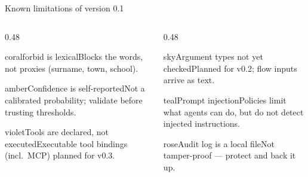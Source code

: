 \documentclass[aspectratio=169,11pt]{beamer}
\begin{document}
\begin{frame}{Known limitations of version 0.1}
\vspace{1mm}
\begin{columns}[T]
\begin{column}{0.48\textwidth}
\begin{card}{coral}{forbid is lexical}Blocks the words, not proxies (surname, town, school).\end{card}
\begin{card}{amber}{Confidence is self-reported}Not a calibrated probability; validate before trusting thresholds.\end{card}
\begin{card}{violet}{Tools are declared, not executed}Executable tool bindings (incl.\ MCP) planned for v0.3.\end{card}
\end{column}
\begin{column}{0.48\textwidth}
\begin{card}{sky}{Argument types not yet checked}Planned for v0.2; flow inputs arrive as text.\end{card}
\begin{card}{teal}{Prompt injection}Policies limit what agents can do, but do not detect injected instructions.\end{card}
\begin{card}{rose}{Audit log is a local file}Not tamper-proof --- protect and back it up.\end{card}
\end{column}
\end{columns}
\vspace{0.5mm}
\end{frame}
\end{document}
